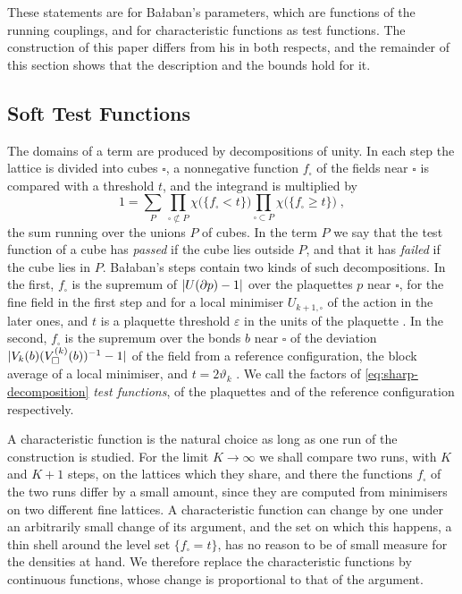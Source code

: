 \documentclass[11pt]{preprint}
\DeclarePairedDelimiter{\abs}{\lvert}{\rvert}
\numberwithin{equation}{section}
\theoremstyle{definition}
\theoremstyle{remark}
\theoremstyle{plain}
\begin{document}
These statements are for Ba{\l}aban's parameters, which are functions of the running couplings, and for characteristic functions as test functions. The construction of this paper differs from his in both respects, and the remainder of this section shows that the description and the bounds hold for it.

\subsection{Soft Test Functions}\label{sec:soft-test-functions}

The domains of a term are produced by decompositions of unity. In each step the lattice is divided into cubes $\square$, a nonnegative function $f_\square$ of the fields near $\square$ is compared with a threshold $t$, and the integrand is multiplied by
\begin{equation}\label{eq:sharp-decomposition}
    1 = \sum_{P}\,\prod_{\square \not\subset P}\chi\bigl(\{ f_\square < t \}\bigr)\prod_{\square \subset P}\chi\bigl(\{ f_\square \geq t \}\bigr)\;,
\end{equation}
the sum running over the unions $P$ of cubes. In the term $P$ we say that the test function of a cube has \emph{passed} if the cube lies outside $P$, and that it has \emph{failed} if the cube lies in $P$. Ba{\l}aban's steps contain two kinds of such decompositions. In the first, $f_\square$ is the supremum of $\abs{U(\partial p) - 1}$ over the plaquettes $p$ near $\square$, for the fine field in the first step and for a local minimiser $U_{k+1,\square}$ of the action in the later ones, and $t$ is a plaquette threshold $\varepsilon$ in the units of the plaquette \cite[(1.1), (1.4), p.~246; (2.17), p.~257; (3.2), p.~265]{BalabanCRE}. In the second, $f_\square$ is the supremum over the bonds $b$ near $\square$ of the deviation $\abs{V_k(b)(V^{(k)}_{\square}(b))^{-1} - 1}$ of the field from a reference configuration, the block average of a local minimiser, and $t = 2\vartheta_k$ \cite[(1.8), p.~247; (3.3), p.~265]{BalabanCRE}. We call the factors of \eqref{eq:sharp-decomposition} \emph{test functions}, of the plaquettes and of the reference configuration respectively.

A characteristic function is the natural choice as long as one run of the construction is studied. For the limit $K \to \infty$ we shall compare two runs, with $K$ and $K + 1$ steps, on the lattices which they share, and there the functions $f_\square$ of the two runs differ by a small amount, since they are computed from minimisers on two different fine lattices. A characteristic function can change by one under an arbitrarily small change of its argument, and the set on which this happens, a thin shell around the level set $\{ f_\square = t \}$, has no reason to be of small measure for the densities at hand. We therefore replace the characteristic functions by continuous functions, whose change is proportional to that of the argument.
\end{document}
